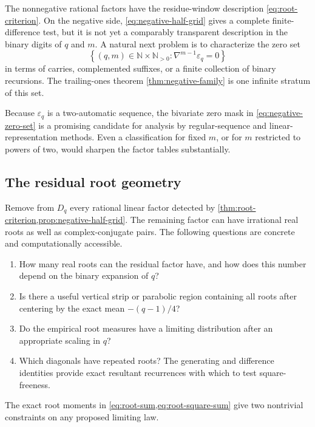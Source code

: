 \documentclass[11pt]{article}
\theoremstyle{definition}
\theoremstyle{remark}
\newcommand{\N}{\mathbb N}
\newcommand{\eps}{\varepsilon}
\newcommand{\Diag}{D}
\begin{document}
The nonnegative rational factors have the residue-window description
\cref{eq:root-criterion}.  On the negative side,
\cref{eq:negative-half-grid} gives a complete finite-difference test, but it
is not yet a comparably transparent description in the binary digits of
\(q\) and \(m\).  A natural next problem is to characterize the zero set
\begin{equation}
 \left\{(q,m)\in\N\times\N_{>0}:
   \nabla^{m-1}\eps_q=0\right\}                           \label{eq:negative-zero-set}
\end{equation}
in terms of carries, complemented suffixes, or a finite collection of
binary recursions.  The trailing-ones theorem
\cref{thm:negative-family} is one infinite stratum of this set.

Because \(\eps_q\) is a two-automatic sequence, the bivariate zero mask in
\cref{eq:negative-zero-set} is a promising candidate for analysis by
regular-sequence and linear-representation methods.  Even a classification
for fixed \(m\), or for \(m\) restricted to powers of two, would sharpen
the factor tables substantially.

\subsection{The residual root geometry}

Remove from \(\Diag_q\) every rational linear factor detected by
\cref{thm:root-criterion,prop:negative-half-grid}.  The remaining factor can
have irrational real roots as well as complex-conjugate pairs.  The
following questions are concrete and computationally accessible.

\begin{enumerate}[leftmargin=2.2em]
\item How many real roots can the residual factor have, and how does this
number depend on the binary expansion of \(q\)?
\item Is there a useful vertical strip or parabolic region containing all
roots after centering by the exact mean \(-(q-1)/4\)?
\item Do the empirical root measures have a limiting distribution after an
appropriate scaling in \(q\)?
\item Which diagonals have repeated roots?  The generating and difference
identities provide exact resultant recurrences with which to test
square-freeness.
\end{enumerate}

The exact root moments in \cref{eq:root-sum,eq:root-square-sum} give two
nontrivial constraints on any proposed limiting law.
\end{document}
